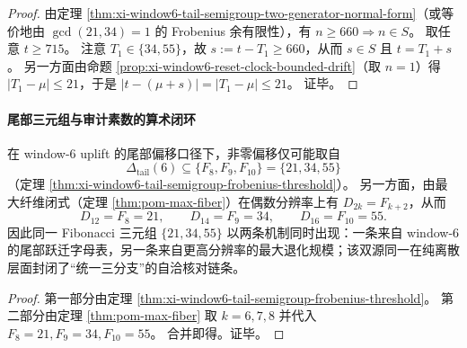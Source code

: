 \begin{proof}
由定理 \ref{thm:xi-window6-tail-semigroup-two-generator-normal-form}（或等价地由 \(\gcd(21,34)=1\) 的 Frobenius 余有限性），有 \(n\ge 660\Rightarrow n\in S\)。
取任意 \(t\ge 715\)。
注意 \(T_1\in\{34,55\}\)，故 \(s:=t-T_1\ge 660\)，从而 \(s\in S\) 且 \(t=T_1+s\)。
另一方面由命题 \ref{prop:xi-window6-reset-clock-bounded-drift}（取 \(n=1\)）得
\(
|T_1-\mu|\le 21
\)，于是
\(
|t-(\mu+s)|=|T_1-\mu|\le 21
\)。
证毕。
\end{proof}

\paragraph{尾部三元组与审计素数的算术闭环}

\begin{corollary}\label{cor:xi-tail-offsets-maxfiber-triple-closure}
在 window-\(6\) uplift 的尾部偏移口径下，非零偏移仅可能取自
\[
\Delta_{\mathrm{tail}}(6)\subseteq \{F_8,F_9,F_{10}\}=\{21,34,55\}
\]
（定理 \ref{thm:xi-window6-tail-semigroup-frobenius-threshold}）。
另一方面，由最大纤维闭式（定理 \ref{thm:pom-max-fiber}）在偶数分辨率上有 \(D_{2k}=F_{k+2}\)，从而
\[
D_{12}=F_8=21,\qquad D_{14}=F_9=34,\qquad D_{16}=F_{10}=55.
\]
因此同一 Fibonacci 三元组 \(\{21,34,55\}\) 以两条机制同时出现：一条来自 window-\(6\) 的尾部跃迁字母表，另一条来自更高分辨率的最大退化规模；该双源同一在纯离散层面封闭了“统一三分支”的自洽核对链条。
\end{corollary}

\begin{proof}
第一部分由定理 \ref{thm:xi-window6-tail-semigroup-frobenius-threshold}。
第二部分由定理 \ref{thm:pom-max-fiber} 取 \(k=6,7,8\) 并代入 \(F_8=21,F_9=34,F_{10}=55\)。
合并即得。证毕。
\end{proof}

